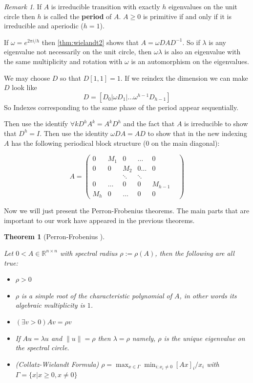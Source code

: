 \documentclass[a4paper,10pt]{article}
\newcommand{\R}{\mathbb{R}}
\newcommand{\gt}{>}
\newcommand{\lt}{<}
\theoremstyle{definition}
\theoremstyle{remark}
\newtheorem{remark}{Remark}
\theoremstyle{plain}
\newtheorem{thm}{Theorem}[section]
\begin{document}
\begin{remark}
\label{remark:wielandt_cyclicity}
If $A$ is irreducible transition with exactly $h$ 
eigenvalues on the unit circle then $h$ is called the \textbf{period} of $A$.
$A \geq 0$ is primitive if and only if it is irreducible and aperiodic ($h=1$).

If $\omega = e^{2 \pi i /h}$ then \ref{thm:wielandt2} shows that $A = \omega D A
D^{-1}$. So if $\lambda$ is any eigenvalue not necessarily on the unit circle,
then $\omega \lambda$ is also an eigenvalue with the same multiplicity and
rotation with $\omega$ is an automorphism on the eigenvalues.

We may choose $D$ so that $D[1,1]=1$. If we reindex the dimension we can make
$D$ look like 
\[
D = [D_0 | \omega D_1 | \dots \omega^{h-1} D_{h-1}]
\] So Indexes corresponding to the same phase of the period appear sequentially.


Then use the identify $\forall k D^hA^{k} = A^k D^h$ and the fact that $A$ is
irreducible to show that $D^h = I$. Then use the identity $\omega DA = AD$ to
show that in the new indexing $A$ has the following periodical block structure
($0$ on the main diagonal):

\[
A = 
\begin{pmatrix}
0 & M_1 & 0 & \dots & 0 \\
0 & 0 & M_2 & 0 \dots & 0 \\
 &  & \ddots & \ddots & &  \\
0 & \dots & 0 & 0 & M_{h-1} \\
M_h & 0 & \dots & 0 & 0 
\end{pmatrix}
\]
\end{remark}


Now we will just present the Perron-Frobenius theorems. The main parts that are
important to our work have appeared in the previous theorems.

\begin{thm}[Perron-Frobenius \cite{meyer2000matrix}]
\label{thm:perron1}


Let $0 \lt A \in \R^{n \times n}$ with spectral radius $\rho := \rho(A)$, then the following are all true:
\begin{itemize}
\item{} $\rho \gt 0$
\item{} $\rho$ is a simple root of the characteristic polynomial of $A$,
in other words its algebraic multiplicity is $1$.
\item{} $(\exists v > 0) Av=\rho v$
\item{} If $Au = \lambda u$ and $\|u\|= \rho$ then $\lambda = \rho$
namely, $\rho$ is the unique eigenvalue on the spectral circle.
\item{(Collatz-Wielandt Formula)} $\rho = \max_{x \in \Gamma} \min_{i : x_i \neq 0} [Ax]_i / x_i$
with $\Gamma = \{x | x \geq 0, x \neq 0\}$
\end{itemize}
\end{thm}
\end{document}
